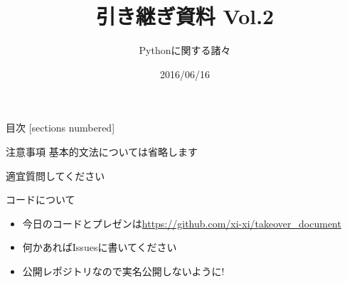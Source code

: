 \documentclass[12pt, dvipdfmx]{beamer}
\title{引き継ぎ資料 Vol.2}
\subtitle{Pythonに関する諸々}
\date{2016/06/16}
\author{}
\institute{}
\begin{document}
\maketitle
\begin{frame}{目次}
  [sections numbered]
  \tableofcontents[hideallsubsections]
\end{frame}

\begin{frame}{注意事項}
    基本的文法については\alert{省略}します

    適宜質問してください
\end{frame}
\begin{frame}{コードについて}
    \begin{itemize}
        \item 今日のコードとプレゼンは\url{https://github.com/xi-xi/takeover_document}

        \item \alert{何かあればIssuesに書いてください}
        \item 公開レポジトリなので実名公開しないように!
    \end{itemize}
\end{frame}
\end{document}
